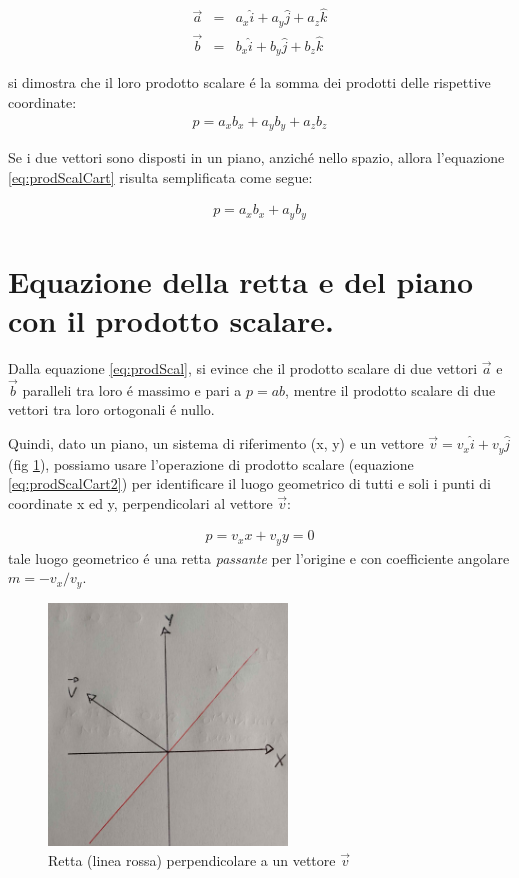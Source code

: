\documentclass[17pt]{extarticle}
\begin{document}
\begin{eqnarray}
	\vec{a} & = & a_x\hat{i} + a_y\hat{j} + a_z\hat{k}\\
	\vec{b} & = & b_x\hat{i} + b_y\hat{j} + b_z\hat{k}
\end{eqnarray}

si dimostra che il loro prodotto scalare \'e la somma dei prodotti delle rispettive coordinate:
\begin{eqnarray}\label{eq:prodScalCart}
	p = a_xb_x + a_yb_y + a_zb_z
\end{eqnarray}

Se i due vettori sono disposti in un piano, anzich\'e nello spazio, allora l'equazione \ref{eq:prodScalCart} risulta semplificata come segue:

\begin{eqnarray}\label{eq:prodScalCart2}
	p = a_xb_x + a_yb_y
\end{eqnarray}


\section{Equazione della retta e del piano con il prodotto scalare.}

Dalla equazione \ref{eq:prodScal}, si evince che il prodotto scalare di due vettori $\vec{a}$ e $\vec{b}$ paralleli tra loro \'e massimo e pari a $p = ab$, mentre il prodotto scalare di due vettori tra loro ortogonali \'e nullo. 

Quindi, dato un piano, un sistema di riferimento (x, y) e un vettore $\vec{v} = v_x\hat{i} + v_y\hat{j}$ (fig \ref{fig:eqRetta}), possiamo usare l'operazione di prodotto scalare (equazione \ref{eq:prodScalCart2}) per identificare il luogo geometrico di tutti e soli i punti di coordinate x ed y, perpendicolari al vettore $\vec{v}$:

\begin{eqnarray}
	p = v_xx + v_yy = 0
\end{eqnarray}
tale luogo geometrico \'e una retta \emph{passante} per l'origine e con coefficiente angolare $m = -v_x/v_y$. 

\begin{figure}[h]	
	\centering
   	\includegraphics[width=2.5in]{eqRetta.jpg}
   	\caption{Retta (linea rossa) perpendicolare a un vettore $\vec{v}$}
   	\label{fig:eqRetta}		
\end{figure}
\end{document}
